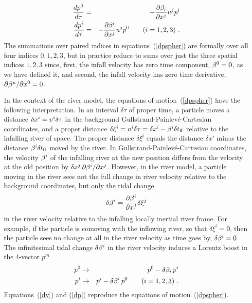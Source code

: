 \documentclass[twocolumn,showpacs,preprintnumbers,amsmath,amssymb,prb]{revtex4}
\begin{document}
\begin{eqnarray}
  {dp^0 \over d\tau} &=&
  - {\partial \beta_i \over \partial x^j}
  u^j p^i
\nonumber
\\
\label{dpspher}
  {dp^i \over d\tau} &=&
  - {\partial \beta^i \over \partial x^j}
  u^j p^0
  \qquad (i = 1,2,3)
  \ .
\end{eqnarray}
The summations over paired indices in equations~(\ref{dpspher})
are formally over all four indices $0,1,2,3$,
but in practice reduce to sums over just the three spatial indices $1,2,3$
since, first,
the infall velocity has zero time component,
$\beta^0 = 0$,
as we have defined it,
and second,
the infall velocity has zero time derivative,
$\partial \beta^\mu / \partial x^0 = 0$.

In the context of the river model,
the equations of motion~(\ref{dpspher})
have the following interpretation.
In an interval $\delta \tau$ of proper time,
a particle moves a distance
$\delta x^i = \upsilon^i \delta \tau$
in the background Gullstrand-Painlev\'e-Cartesian coordinates,
and a proper distance
$\delta \xi^i = u^i \delta \tau = \delta x^i - \beta^i \delta t_{\rm ff}$
relative to the infalling river of space.
The proper distance $\delta \xi^i$ equals the distance $\delta x^i$
minus the distance $\beta^i \delta t_{\rm ff}$ moved by the river.
In Gullstrand-Painlev\'e-Cartesian coordinates,
the velocity $\beta^i$ of the infalling river at the new position differs
from the velocity at the old position by
$\delta x^j \, \partial \beta^i / \partial x^j$.
However,
in the river model,
a particle moving in the river sees not the full change in river velocity
relative to the background coordinates,
but only the tidal change
\begin{equation}
\label{dv}
  \delta \beta^i = {\partial \beta^i \over \partial x^j} \delta \xi^j
\end{equation}
in the river velocity relative to the infalling locally inertial river frame.
For example,
if the particle is comoving with the inflowing river,
so that $\delta \xi^i = 0$,
then the particle sees no change at all in the river velocity as time goes by,
$\delta \beta^i = 0$.
The infinitesimal tidal change $\delta \beta^i$ in the river velocity
induces a Lorentz boost in the 4-vector $p^m$
\begin{eqnarray}
\label{dp}
  p^0 &\rightarrow& p^0 - \delta \beta_i \, p^i
\nonumber
\\
  p^i &\rightarrow& p^i - \delta \beta^i \, p^0
  \qquad (i = 1,2,3)
  \ .
\end{eqnarray}
Equations~(\ref{dv}) and (\ref{dp})
reproduce the equations of motion~(\ref{dpspher}).
\end{document}
